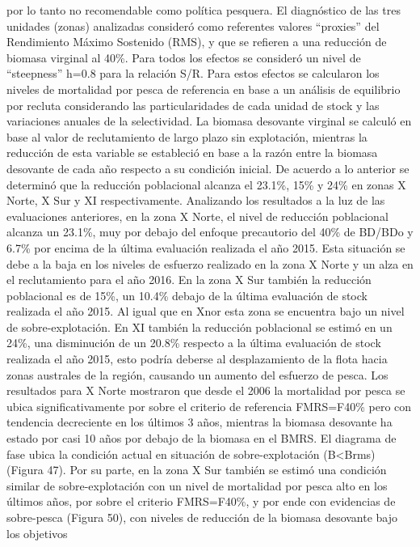 \documentclass[
]{article}
\begin{document}
por lo tanto no recomendable como política pesquera. El diagnóstico de
las tres unidades (zonas) analizadas consideró como referentes valores
``proxies'' del Rendimiento Máximo Sostenido (RMS), y que se refieren a
una reducción de biomasa virginal al 40\%. Para todos los efectos se
consideró un nivel de ``steepness'' h=0.8 para la relación S/R. Para
estos efectos se calcularon los niveles de mortalidad por pesca de
referencia en base a un análisis de equilibrio por recluta considerando
las particularidades de cada unidad de stock y las variaciones anuales
de la selectividad. La biomasa desovante virginal se calculó en base al
valor de reclutamiento de largo plazo sin explotación, mientras la
reducción de esta variable se estableció en base a la razón entre la
biomasa desovante de cada año respecto a su condición inicial. De
acuerdo a lo anterior se determinó que la reducción poblacional alcanza
el 23.1\%, 15\% y 24\% en zonas X Norte, X Sur y XI respectivamente.
Analizando los resultados a la luz de las evaluaciones anteriores, en la
zona X Norte, el nivel de reducción poblacional alcanza un 23.1\%, muy
por debajo del enfoque precautorio del 40\% de BD/BDo y 6.7\% por encima
de la última evaluación realizada el año 2015. Esta situación se debe a
la baja en los niveles de esfuerzo realizado en la zona X Norte y un
alza en el reclutamiento para el año 2016. En la zona X Sur también la
reducción poblacional es de 15\%, un 10.4\% debajo de la última
evaluación de stock realizada el año 2015. Al igual que en Xnor esta
zona se encuentra bajo un nivel de sobre-explotación. En XI también la
reducción poblacional se estimó en un 24\%, una disminución de un 20.8\%
respecto a la última evaluación de stock realizada el año 2015, esto
podría deberse al desplazamiento de la flota hacia zonas australes de la
región, causando un aumento del esfuerzo de pesca. Los resultados para X
Norte mostraron que desde el 2006 la mortalidad por pesca se ubica
significativamente por sobre el criterio de referencia FMRS=F40\% pero
con tendencia decreciente en los últimos 3 años, mientras la biomasa
desovante ha estado por casi 10 años por debajo de la biomasa en el
BMRS. El diagrama de fase ubica la condición actual en situación de
sobre-explotación (B\textless Brms) (Figura 47). Por su parte, en la
zona X Sur también se estimó una condición similar de sobre-explotación
con un nivel de mortalidad por pesca alto en los últimos años, por sobre
el criterio FMRS=F40\%, y por ende con evidencias de sobre-pesca (Figura
50), con niveles de reducción de la biomasa desovante bajo los objetivos
\end{document}
